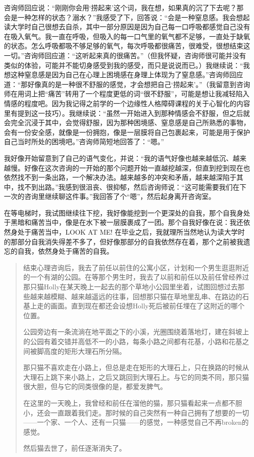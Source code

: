 咨询师回应说：“刚刚你会用‘捞起来’这个词，我在想，如果真的沉了下去呢？那会是一种怎样的状态？溺水？”我感受了下，回答说：“会是一种窒息感。我会想起读大学时自己很想去自杀，其中一部分原因是因为自己每一口呼吸都感觉自己没有在吸入氧气。我一直在呼吸，但吸入的每一口气里的氧气都不足够，一直处于缺氧的状态。怎么呼吸都吸不够足够的氧气，每次呼吸都很痛苦，很难受，很想结束这一切。”咨询师回应道：“这听起来真的很痛苦。”（但我怀疑，咨询师很可能并没有类似的体验，可能并不能切身感受到我的感受，而只是说说而已。）我继续说：“我想这种窒息感是因为自己在心理上困境感在身理上体现为了窒息感。”咨询师回应道：“那好像真的是一种很不舒服的感觉，才会想把自己‘捞起来’。”（我留意到咨询师在用词上把“痛苦”转用了一个程度更低的词“很不舒服”，可能是想让我减轻陷入情感的程度吧。因为我记得之前学的一个边缘性人格障碍课程的关于心智化的内容里有提到这一技巧）。我继续说：“虽然一开始进入到那种情感会不舒服，但之后就会完全沉浸于其中，会觉得舒服，因为那种困境感、窒息感是自己所熟悉的事物，会有一份安全感，就像是一份拥抱，像是一层膜将自己包裹起来，可能是用于保护自己当时所处的困境吧。”咨询师简短地回答了：“嗯。”

我好像开始留意到了自己的语气变化，并说：“我的语气好像也越来越低沉、越来越慢。好像在这次咨询的一开始的那个问题开始一直越挖越深，但直到挖到现在也依然找不到一条出路，一个解决办法。越来越多的冲突和矛盾，越来越深陷于其中，找不到出路。”我感到很沮丧、很抑郁，然后咨询师说：“这可能需要我们在下一次的咨询里继续聊这件事。”我回答了个“嗯”，然后起身离开咨询室。

在等电梯时，我试图继续往下挖，我好像能挖到一个更深处的自我，那个自我身处于黑暗和痛苦当中，像是在水下被一层膜裹成了一团。那个自我好像在说：我还依然身处于痛苦当中，LOOK AT ME! 在毕业之后，我就理所当然地认为读大学时的那部分自我消失得差不多了，但好像那部分的自我依然存在着，那个之前被我遗忘的自我，依然身处于痛苦的自我。


\blockquote{
    结束心理咨询后，我去了前任以前住的公寓小区，计划和一个男生逛逛附近的一个有湖的公园。在等那个男生时，我去了以前和前任以及前任曾经养过那只猫Holly在某天晚上一起去的那个草地小公园里坐着，试图回想过去那些越来越模糊、越来越遥远的往事，回想那只猫在草地里乱串、在路边的石基上走的画面。直到现在都还会设想Holly死后被前任埋在了这附近的哪个位置。

    公园旁边有一条流淌在地平面之下的小溪，光圈围绕着落地灯，建在斜坡上的公园有着交错并高低不一的小路，每条小路之间都有花基，小路和花基之间被脚高度的矩形大理石所分隔。

    那只猫不喜欢走在小路上，但总是走在矩形的大理石上，只在换路的时候从大理石上跳下来小路上，之后又跳回到大理石上。与它的同类不同，那只猫很大胆，但与它的同类很像的是，都爱发脾气。

    在这里的一天晚上，我曾经和前任在溜他的猫，那只猫看起来一点都不胆小，还会一直跟着我们走。那时候的自己突然有一种自己拥有了想要的一切——一个家、一个人、还有一只猫——的感觉，一种感觉自己不再broken的感觉。

    然后猫去世了，前任逐渐消失了。
}


